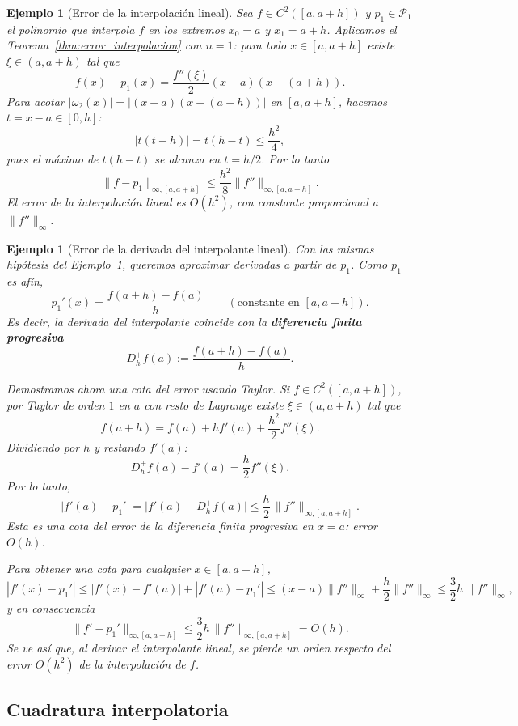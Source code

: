 \documentclass[a4paper,11pt]{report}
\newtheorem{example}[theorem]{Ejemplo}
\begin{document}
\begin{example}[Error de la interpolación lineal]\label{ex:error_interpolacion_lineal}
Sea $f\in C^2([a,a+h])$ y $p_1\in\mathcal{P}_1$ el polinomio que interpola $f$ en los extremos $x_0=a$ y $x_1=a+h$.  Aplicamos el Teorema~\ref{thm:error_interpolacion} con $n=1$: para todo $x\in[a,a+h]$ existe $\xi\in(a,a+h)$ tal que
\[
f(x)-p_1(x)=\frac{f''(\xi)}{2}(x-a)(x-(a+h)).
\]
Para acotar $|\omega_2(x)|=|(x-a)(x-(a+h))|$ en $[a,a+h]$, hacemos $t=x-a\in[0,h]$:
\[
|t(t-h)|=t(h-t)\le\frac{h^2}{4},
\]
pues el máximo de $t(h-t)$ se alcanza en $t=h/2$.  Por lo tanto
\[
\|f-p_1\|_{\infty,[a,a+h]}\le\frac{h^2}{8}\|f''\|_{\infty,[a,a+h]}.
\]
El error de la interpolación lineal es $O(h^2)$, con constante proporcional a~$\|f''\|_\infty$.
\end{example}

\begin{example}[Error de la derivada del interpolante lineal]\label{ex:error_derivada_interpolacion_lineal}
Con las mismas hipótesis del Ejemplo~\ref{ex:error_interpolacion_lineal}, queremos aproximar derivadas a partir de $p_1$.  Como $p_1$ es afín,
\[
p_1'(x)=\frac{f(a+h)-f(a)}{h}\qquad(\text{constante en }[a,a+h]).
\]
Es decir, la derivada del interpolante coincide con la \textbf{diferencia finita progresiva}
\[
D_h^+f(a):=\frac{f(a+h)-f(a)}{h}.
\]

Demostramos ahora una cota del error usando Taylor.  Si $f\in C^2([a,a+h])$, por Taylor de orden $1$ en $a$ con resto de Lagrange existe $\xi\in(a,a+h)$ tal que
\[
f(a+h)=f(a)+h f'(a)+\frac{h^2}{2}f''(\xi).
\]
Dividiendo por $h$ y restando $f'(a)$:
\[
D_h^+f(a)-f'(a)=\frac{h}{2}f''(\xi).
\]
Por lo tanto,
\[
\bigl|f'(a)-p_1'\bigr|=\bigl|f'(a)-D_h^+f(a)\bigr|\le \frac{h}{2}\,\|f''\|_{\infty,[a,a+h]}.
\]
Esta es una cota del error de la diferencia finita progresiva en $x=a$: error $O(h)$.

Para obtener una cota para cualquier $x\in[a,a+h]$,
\[
|f'(x)-p_1'|\le |f'(x)-f'(a)|+|f'(a)-p_1'|
\le (x-a)\|f''\|_\infty+\frac{h}{2}\|f''\|_\infty
\le \frac{3}{2}h\,\|f''\|_\infty,
\]
y en consecuencia
\[
\|f'-p_1'\|_{\infty,[a,a+h]}\le \frac{3}{2}h\,\|f''\|_{\infty,[a,a+h]}=O(h).
\]
Se ve así que, al derivar el interpolante lineal, se pierde un orden respecto del error $O(h^2)$ de la interpolación de $f$.
\end{example}

\subsection{Cuadratura interpolatoria}\label{sec:cuadratura_interpolatoria}
\end{document}
